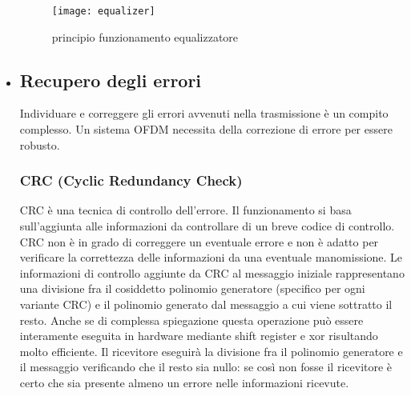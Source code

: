 \begin{itemize}
     \begin{figure}[h]
     	\centering
     	\texttt{[image: equalizer]}
     	\caption{principio funzionamento equalizzatore \cite{equalizer}}\label{fig:1}
     \end{figure}
 \newpage
 \item \subsection{Recupero degli errori} Individuare e correggere gli errori avvenuti nella trasmissione è un compito complesso. Un sistema OFDM necessita della correzione di errore per essere robusto.
 \subsubsection{CRC (Cyclic Redundancy Check)}
 CRC è una tecnica di controllo dell'errore. Il funzionamento si basa sull'aggiunta alle informazioni da controllare di un breve codice di controllo. CRC non è in grado di correggere un eventuale errore e non è adatto per verificare la correttezza delle informazioni da una eventuale manomissione. Le informazioni di controllo aggiunte da CRC al messaggio iniziale rappresentano una divisione fra il cosiddetto polinomio generatore (specifico per ogni variante CRC) e il polinomio generato dal messaggio a cui viene sottratto il resto. Anche se di complessa spiegazione questa operazione può essere interamente eseguita in hardware mediante shift register e xor  risultando molto efficiente. Il ricevitore eseguirà la divisione fra il polinomio generatore e il messaggio verificando che il resto sia nullo: se così non fosse il ricevitore è certo che sia presente almeno un errore nelle informazioni ricevute. \cite{crc}
 

\end{itemize}
